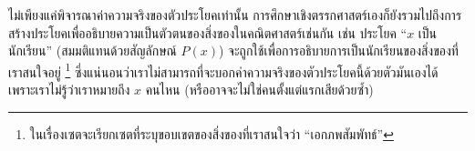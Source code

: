 ไม่เพียงแค่พิจารณาค่าความจริงของตัวประโยคเท่านั้น การศึกษาเชิงตรรกศาสตร์เองก็ยังรวมไปถึงการสร้างประโยคเพื่ออธิบายความเป็นตัวตนของสิ่งของในคณิตศาสตร์เช่นกัน เช่น ประโยค ``$x$ เป็นนักเรียน'' (สมมติแทนด้วยสัญลักษณ์ $P(x)$) จะถูกใช้เพื่อการอธิบายการเป็นนักเรียนของสิ่งของที่เราสนใจอยู่ \footnote{ในเรื่องเซตจะเรียกเซตที่ระบุขอบเขตของสิ่งของที่เราสนใจว่า ``เอกภพสัมพัทธ์''} ซึ่งแน่นอนว่าเราไม่สามารถที่จะบอกค่าความจริงของตัวประโยคนี้ด้วยตัวมันเองได้ เพราะเราไม่รู้ว่าเราหมายถึง $x$ คนไหน (หรืออาจจะไม่ใช่คนตั้งแต่แรกเสียด้วยซ้ำ) 

